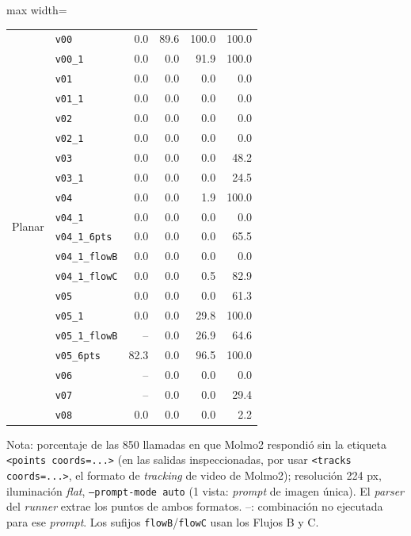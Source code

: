 \begin{table}[htbp]
\begin{lrbox}{\tablebox}
\begin{adjustbox}{max width=\textwidth}
\begin{tabular}{llrrrr}
\midrule
\multirow{20}{*}{Planar} & \texttt{v00} & 0.0 & 89.6 & 100.0 & 100.0 \\
 & \texttt{v00\_1} & 0.0 & 0.0 & 91.9 & 100.0 \\
 & \texttt{v01} & 0.0 & 0.0 & 0.0 & 0.0 \\
 & \texttt{v01\_1} & 0.0 & 0.0 & 0.0 & 0.0 \\
 & \texttt{v02} & 0.0 & 0.0 & 0.0 & 0.0 \\
 & \texttt{v02\_1} & 0.0 & 0.0 & 0.0 & 0.0 \\
 & \texttt{v03} & 0.0 & 0.0 & 0.0 & 48.2 \\
 & \texttt{v03\_1} & 0.0 & 0.0 & 0.0 & 24.5 \\
 & \texttt{v04} & 0.0 & 0.0 & 1.9 & 100.0 \\
 & \texttt{v04\_1} & 0.0 & 0.0 & 0.0 & 0.0 \\
 & \texttt{v04\_1\_6pts} & 0.0 & 0.0 & 0.0 & 65.5 \\
 & \texttt{v04\_1\_flowB} & 0.0 & 0.0 & 0.0 & 0.0 \\
 & \texttt{v04\_1\_flowC} & 0.0 & 0.0 & 0.5 & 82.9 \\
 & \texttt{v05} & 0.0 & 0.0 & 0.0 & 61.3 \\
 & \texttt{v05\_1} & 0.0 & 0.0 & 29.8 & 100.0 \\
 & \texttt{v05\_1\_flowB} & -- & 0.0 & 26.9 & 64.6 \\
 & \texttt{v05\_6pts} & 82.3 & 0.0 & 96.5 & 100.0 \\
 & \texttt{v06} & -- & 0.0 & 0.0 & 0.0 \\
 & \texttt{v07} & -- & 0.0 & 0.0 & 29.4 \\
 & \texttt{v08} & 0.0 & 0.0 & 0.0 & 2.2 \\
\bottomrule
\end{tabular}
\end{adjustbox}
\end{lrbox}
\usebox{\tablebox}

\vspace{1.5ex}
\begin{minipage}{\wd\tablebox}
\footnotesize
Nota: porcentaje de las 850 llamadas en que Molmo2 respondió sin la etiqueta \texttt{<points coords=...>} (en las salidas inspeccionadas, por usar \texttt{<tracks coords=...>}, el formato de \textit{tracking} de video de Molmo2); resolución 224 px, iluminación \textit{flat}, \texttt{--prompt-mode auto} (1 vista: \textit{prompt} de imagen única). El \textit{parser} del \textit{runner} extrae los puntos de ambos formatos. --: combinación no ejecutada para ese \textit{prompt}. Los sufijos \texttt{flowB}/\texttt{flowC} usan los Flujos B y C.
\end{minipage}
\end{table}
